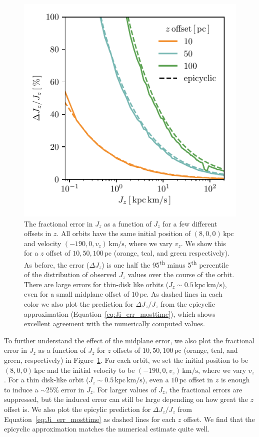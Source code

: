 \documentclass[twocolumn]{aastex62}
\newcommand{\pc}{\text{pc}}
\newcommand{\kpc}{\text{kpc}}
\newcommand{\kms}{\text{km}/\text{s}}
\newcommand{\actunit}{\text{kpc}\,\kms}
\newcommand{\uth}{\textsuperscript{th}}
\begin{document}
\begin{figure}
\begin{center}
\includegraphics[width=\columnwidth]{fig/schmactions_many_orbits_Jz_fun.pdf}
\end{center}
\caption{The fractional error in $J_z$ as a function of $J_z$ for a few
different offsets in $z$. All orbits have the same initial position of $(8, 0,
0)\,\kpc$ and velocity $(-190, 0, v_z)\,\kms$, where we vary $v_z$. We show
this for a $z$ offset of $10, 50, 100\,\pc$ (orange, teal, and green
respectively). As before, the error ($\Delta J_z$) is one half the 95\uth{}
minus 5\uth{} percentile of the distribution of observed $J_z$ values over the
course of the orbit. There are large errors for thin-disk like orbits ($J_z
\sim 0.5\,\actunit$), even for a small midplane offset of $10\,\pc$. As dashed
lines in each color we also plot the prediction for $\Delta J_z/J_z$ from the
epicyclic approximation (Equation~\eqref{eq:Ji_err_mosttime}), which shows
excellent agreement with the numerically computed values.}
\label{fig:dJz_fun_Jz}
\end{figure}

To further understand the effect of the midplane error, we also plot the
fractional error in $J_z$ as a function of $J_z$ for $z$ offsets of $10, 50,
100\,\pc$ (orange, teal, and green, respectively) in
Figure~\ref{fig:dJz_fun_Jz}. For each orbit, we set the initial position to be
$(8,0,0)\,\kpc$ and the initial velocity to be $(-190, 0, v_z)\,\kms$, where
we vary $v_z$. For a thin disk-like orbit ($J_z\sim0.5\,\actunit$), even a
$10\,\pc$ offset in $z$ is enough to induce a $\sim25\%$ error in $J_z$. For
larger values of $J_z$, the fractional errors are suppressed, but the induced
error can still be large depending on how great the $z$ offset is. We also
plot the epicylic prediction for $\Delta J_z / J_z$ from
Equation~\eqref{eq:Ji_err_mosttime} as dashed lines for each $z$ offset. We
find that the epicyclic approximation matches the numerical estimate quite
well.
\end{document}
